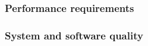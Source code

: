 \documentclass[letterpaper, 10pt, draftclsnofoot, onecolumn]{IEEEtran}
\begin{document}

\subsubsection[Performance
requirements]{\rmfamily\bfseries\color{black}
Performance requirements}


\subsubsection[System and software
quality]{\rmfamily\bfseries\color{black} System
and software quality}
\end{document}
